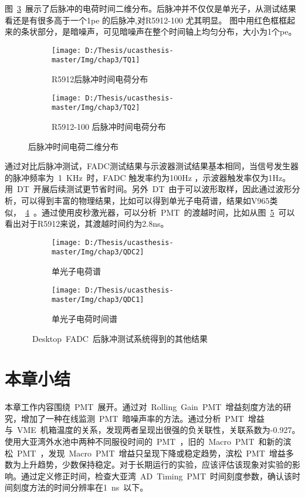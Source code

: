 图~\ref{fig:TQ}~展示了后脉冲的电荷时间二维分布。后脉冲并不仅仅是单光子，从测试结果看还是有很多高于一个1pe 的后脉冲,对R5912-100 尤其明显。
图中用红色框框起来的条状部分，是暗噪声，可见暗噪声在整个时间轴上均匀分布，大小为1个pe。
\begin{figure}[!htb]
  \centering
  \begin{subfigure}[b]{\MySubFactor\textwidth}
    \texttt{[image: D:/Thesis/ucasthesis-master/Img/chap3/TQ1]}
    \caption{R5912后脉冲时间电荷分布}
    \label{fig:TQ_1}
  \end{subfigure}%
  \quad\quad\quad\quad%
  \begin{subfigure}[b]{\MySubFactor\textwidth}
    \texttt{[image: D:/Thesis/ucasthesis-master/Img/chap3/TQ2]}
    \caption{R5912-100 后脉冲时间电荷分布}
    \label{fig:TQ_2}
  \end{subfigure}
  \caption{后脉冲时间电荷二维分布}
  \label{fig:TQ}
\end{figure}
通过对比后脉冲测试，FADC测试结果与示波器测试结果基本相同，当信号发生器的脉冲频率为~1~KHz~时，FADC 触发率约为100Hz ，示波器触发率仅为1Hz。用~DT~开展后续测试更节省时间。另外~DT~由于可以波形取样，因此通过波形分析，可以得到丰富的物理结果，比如可以得到单光子电荷谱，结果如V965类似，~\ref{fig:QDC_1}~。通过使用皮秒激光器，可以分析~PMT~的渡越时间，比如从图~\ref{fig:QDC_2}~可以看出对于R5912来说，其渡越时间约为2.8ns。
\begin{figure}[!htb]
  \centering
  \begin{subfigure}[b]{\MySubFactor\textwidth}
    \texttt{[image: D:/Thesis/ucasthesis-master/Img/chap3/QDC2]}
    \caption{单光子电荷谱}
    \label{fig:QDC_1}
  \end{subfigure}%
  \quad\quad\quad\quad%
  \begin{subfigure}[b]{\MySubFactor\textwidth}
    \texttt{[image: D:/Thesis/ucasthesis-master/Img/chap3/QDC1]}
    \caption{单光子电荷时间谱}
    \label{fig:QDC_2}
  \end{subfigure}
  \caption{~Desktop~FADC~后脉冲测试系统得到的其他结果}
  \label{fig:QDC}
\end{figure}
\section{本章小结}
本章工作内容围绕~PMT~展开。通过对~Rolling~Gain~PMT~增益刻度方法的研究，增加了一种在线监测~PMT~暗噪声率的方法。通过分析~PMT~增益与~VME~机箱温度的关系，发现两者呈现出很强的负关联性，关联系数为-0.927。使用大亚湾外水池中两种不同服役时间的~PMT~，旧的~Macro~PMT~和新的滨松~PMT~，发现~Macro~PMT~增益只呈现下降或稳定趋势，滨松~PMT~增益多数为上升趋势，少数保持稳定。对于长期运行的实验，应该评估该现象对实验的影响。通过定义修正时间，检查大亚湾~AD~Timing~PMT~时间刻度参数，确认该时间刻度方法的时间分辨率在1~ns~以下。

